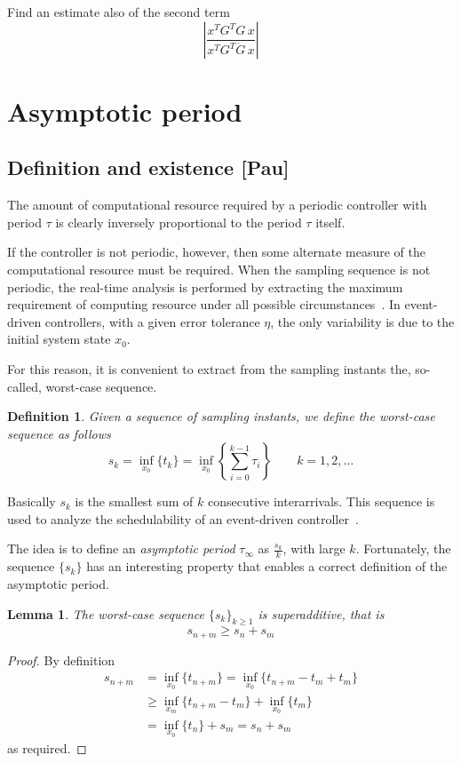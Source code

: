 \documentclass[12pt,draftcls,onecolumn]{IEEEtran} %
\newtheorem{lemma}{Lemma}
\newtheorem{definition}[theorem]{Definition}
\begin{document}
Find an estimate also of the second term
\[
\left|\frac{x^TG^TG\, x}{x^TG^T\dot G\,x}\right|
\]


\section{Asymptotic period}
\label{sec:asym}

\subsection{Definition and existence [Pau]}
\label{sec:asymExists}

The amount of computational resource required by a periodic controller
with period $\tau$ is clearly inversely proportional to the period
$\tau$ itself.

If the controller is not periodic, however, then some alternate
measure of the computational resource must be required.  When the
sampling sequence is not periodic, the real-time analysis is performed
by extracting the maximum requirement of computing resource under all
possible circumstances~\cite{Cru91,Gre93,Vel08a}. In event-driven
controllers, with a given error tolerance $\eta$, the only variability
is due to the initial system state $x_0$.

For this reason, it is convenient to extract from the sampling
instants the, so-called, worst-case sequence.
\begin{definition}
  Given a sequence of sampling instants, we define the
  \emph{worst-case sequence} as follows
  \begin{equation}
    \label{eq:I:defIk}
    s_k=\inf_{x_0}\{t_k\} = \inf_{x_0}\left\{\sum_{i=0}^{k-1}\tau_i\right\}
    \qquad k=1,2,\ldots
  \end{equation}
  \label{def:S:wcSeq}
\end{definition}
Basically $s_k$ is the smallest sum of $k$ consecutive interarrivals.
This sequence is used to analyze the schedulability of an event-driven
controller~\cite{Vel08a}.

The idea is to define an \emph{asymptotic period} $\tau_\infty$ as
$\frac{s_k}k$, with large $k$. Fortunately, the sequence $\{s_k\}$ has
an interesting property that enables a correct definition of the
asymptotic period.
\begin{lemma}
  The worst-case sequence $\{s_k\}_{k\geq 1}$ is \emph{superadditive},
  that is
  \begin{equation*}
    s_{n+m} \geq s_n+s_m
  \end{equation*}
  \label{lem:I:superAdd}
\end{lemma}
\begin{proof}
  By definition
  \begin{align*}
    s_{n+m} & = \inf_{x_0}\{t_{n+m}\} = \inf_{x_0}\{t_{n+m}-t_m+t_m\} \\
    & \geq \inf_{x_m}\{t_{n+m}-t_m\}+\inf_{x_0}\{t_m\} \\
    & = \inf_{x_0}\{t_n\}+s_m= s_n+s_m
  \end{align*}
  as required.
\end{proof}
\end{document}
